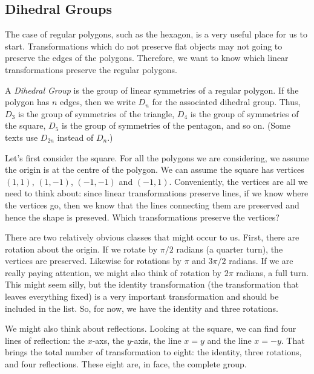 \documentclass[fleqn]{report}
\begin{document}
\subsection{Dihedral Groups}
\label{dihedral-groups}

The case of regular polygons, such as the hexagon, is a very
useful place for us to start. Transformations which do not
preserve flat objects may not going to preserve the edges of
the polygons. Therefore, we want to know which linear
transformations preserve the regular polygons. 

\begin{defn}
A \emph{Dihedral Group} is the group of linear symmetries of a
regular polygon. If the polygon has $n$ edges, then we write
$D_n$ for the associated dihedral group. Thus, $D_3$ is the
group of symmetries of the triangle, $D_4$ is the group of
symmetries of the square, $D_5$ is the group of symmetries of
the pentagon, and so on. (Some texts use $D_{2n}$ instead of
$D_n$.)
\end{defn}

\begin{example}
Let's first consider the square. For all the polygons we are
considering, we assume the origin is at the centre of the
polygon. We can assume the square has vertices $(1,1)$,
$(1,-1)$, $(-1,-1)$ and $(-1,1)$. Conveniently, the vertices
are all we need to think about: since linear transformations
preserve lines, if we know where the vertices go, then we know
that the lines connecting them are preserved and hence the
shape is preseved. Which transformations preserve the
vertices?

There are two relatively obvious classes that might occur to us.
First, there are rotation about the origin. If we rotate by
$\pi/2$ radians (a quarter turn), the vertices are preserved.
Likewise for rotations by $\pi$ and $3\pi/2$ radians. If we
are really paying attention, we might also think of rotation
by $2\pi$ radians, a full turn. This might seem silly, but
the identity transformation (the transformation that leaves
everything fixed) is a very important transformation and
should be included in the list. So, for now, we have the
identity and three rotations.

We might also think about reflections. Looking at the square,
we can find four lines of reflection: the $x$-axs, the
$y$-axis, the line $x=y$ and the line $x=-y$. That brings the
total number of transformation to eight: the identity, three
rotations, and four reflections. These eight are, in face, the
complete group.
\end{example}
\end{document}
